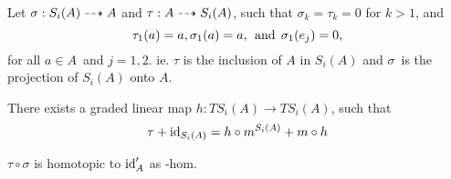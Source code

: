 Let $\sigma: S_i(A) \dashrightarrow A$ and $\tau : A \dashrightarrow S_i(A)$, such that $\sigma_k
= \tau_k = 0$ for $k> 1$, and 
\[ \tau_1(a) = a, \sigma_1(a) = a, \:\:\text{and}\:\: \sigma_1(e_j) = 0, \]
for all $a \in A$ and $j = 1,2$. ie. $\tau$ is the inclusion of $A$ in
$S_i(A)$ and $\sigma$ is the projection of $S_i(A)$ onto $A$.




\begin{lemma}
\label{lemma:tau_id_homotopy}
There exists a graded linear map $h: TS_i(A) \to TS_i(A)$, such that 
\[ \tau + \operatorname{id}_{S_i(A)} = h \circ m^{S_i(A)} + m \circ h\]

$\tau \circ \sigma$ is homotopic to $\operatorname{id}_A'$ as \Ainf-hom. 
\end{lemma}





